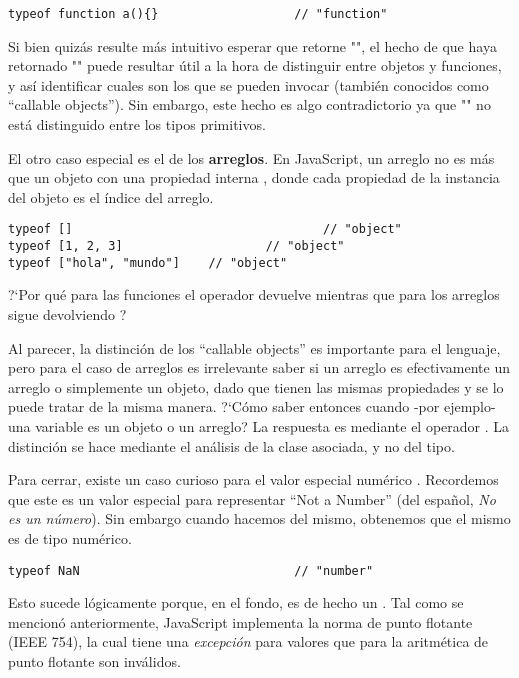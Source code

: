 \begin{lstlisting}[title={Analizando \code{typeof} de una función}]
typeof function a(){}					// "function"
\end{lstlisting}

Si bien quizás resulte más intuitivo esperar que retorne "", el hecho de que haya retornado "" puede resultar útil a la hora de distinguir entre objetos y funciones, y así identificar cuales son los que se pueden invocar (también conocidos como "`callable objects"'). Sin embargo, este hecho es algo contradictorio ya que "" no está distinguido entre los tipos primitivos.

El otro caso especial es el de los \textbf{arreglos}. En JavaScript, un arreglo no es más que un objeto con una propiedad interna , donde cada propiedad de la instancia del objeto es el índice del arreglo.

\begin{lstlisting}[title={Analizando \code{typeof} de arreglos}]
typeof []									// "object"
typeof [1, 2, 3]					// "object"
typeof ["hola", "mundo"]	// "object"
\end{lstlisting}

?`Por qué para las funciones el operador  devuelve  mientras que para los arreglos sigue devolviendo ? 

Al parecer, la distinción de los "`callable objects"' es importante para el lenguaje, pero para el caso de arreglos es irrelevante saber si un arreglo es efectivamente un arreglo o simplemente un objeto, dado que tienen las mismas propiedades y se lo puede tratar de la misma manera. ?`Cómo saber entonces cuando -por ejemplo- una variable es un objeto o un arreglo? La respuesta es mediante el operador . La distinción se hace mediante el análisis de la clase asociada, y no del tipo.

Para cerrar, existe un caso curioso para el valor especial numérico . Recordemos que este es un valor especial para representar "`Not a Number"' (del español, \textit{No es un número}). Sin embargo cuando hacemos  del mismo, obtenemos que el mismo es de tipo numérico.

\begin{lstlisting}[title={Analizando \code{typeof} de \code{NaN}}]
typeof NaN								// "number"
\end{lstlisting}

Esto sucede lógicamente porque, en el fondo,  es de hecho un . Tal como se mencionó anteriormente, JavaScript implementa la norma de punto flotante (IEEE 754), la cual tiene una \textit{excepción} para valores que para la aritmética de punto flotante son inválidos.
